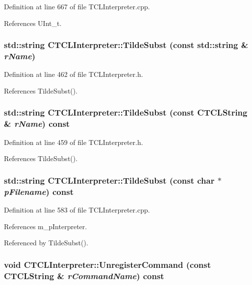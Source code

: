 Definition at line 667 of file TCLInterpreter.cpp.

References UInt\_\-t.
\subsubsection{\setlength{\rightskip}{0pt plus 5cm}std::string CTCLInterpreter::Tilde\-Subst (const std::string \& {\em r\-Name})\hspace{0.3cm}{\tt  [inline]}}\label{classCTCLInterpreter_a31}




Definition at line 462 of file TCLInterpreter.h.

References Tilde\-Subst().
\subsubsection{\setlength{\rightskip}{0pt plus 5cm}std::string CTCLInterpreter::Tilde\-Subst (const {\bf CTCLString} \& {\em r\-Name}) const\hspace{0.3cm}{\tt  [inline]}}\label{classCTCLInterpreter_a30}




Definition at line 459 of file TCLInterpreter.h.

References Tilde\-Subst().
\subsubsection{\setlength{\rightskip}{0pt plus 5cm}std::string CTCLInterpreter::Tilde\-Subst (const char $\ast$ {\em p\-Filename}) const}\label{classCTCLInterpreter_a29}




Definition at line 583 of file TCLInterpreter.cpp.

References m\_\-p\-Interpreter.

Referenced by Tilde\-Subst().
\subsubsection{\setlength{\rightskip}{0pt plus 5cm}void CTCLInterpreter::Unregister\-Command (const {\bf CTCLString} \& {\em r\-Command\-Name}) const\hspace{0.3cm}{\tt  [inline]}}\label{classCTCLInterpreter_a41}




